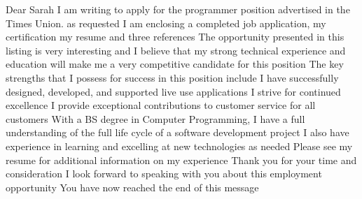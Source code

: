 Dear Sarah I am writing to apply for the programmer position advertised in the Times Union. as requested I am enclosing a completed job application, my certification my resume and three references The opportunity presented in this listing is very interesting and I believe that my strong technical experience and education will make me a very competitive candidate for this position The key strengths that I possess for success in this position include I have successfully designed, developed, and supported live use applications I strive for continued excellence I provide exceptional contributions to customer service for all customers With a BS degree in Computer Programming, I have a full understanding of the full life cycle of a software development project I also have experience in learning and excelling at new technologies as needed Please see my resume for additional information on my experience Thank you for your time and consideration I look forward to speaking with you about this employment opportunity You have now reached the end of this message 
